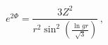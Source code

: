 \begin{equation}
e^{2\Phi} = \frac{3Z^2}{r^2\sin^2 \left(\frac{\ln gr}{\sqrt 3}\right)}\,,
            \label{hyperbol}
\end{equation}


